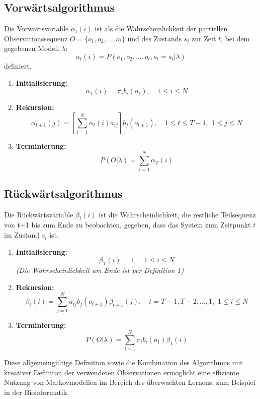\subsection{Vorwärtsalgorithmus}

Die Vorwärtsvariable $\alpha_t(i)$ ist als die Wahrscheinlichkeit der partiellen Observationssequenz $O = \{o_1, o_2, \dots, o_t\}$ und des Zustands $s_i$ zur Zeit $t$, bei dem gegebenen Modell $\lambda$:
$$\alpha_t(i) = P(o_1, o_2, \dots, o_t, s_t = s_i | \lambda)$$ definiert.

\begin{enumerate}
    \item \textbf{Initialisierung:}
    $$\alpha_1(i) = \pi_i b_i(o_1), \quad 1 \leq i \leq N$$

    \item \textbf{Rekursion:}
    $$\alpha_{t+1}(j) = \left[ \sum_{i=1}^{N} \alpha_t(i) a_{ij} \right] b_j(o_{t+1}), \quad 1 \leq t \leq T-1, \,\, 1 \leq j \leq N$$

    \item \textbf{Terminierung:}
    $$P(O|\lambda) = \sum_{i=1}^{N} \alpha_T(i)$$
\end{enumerate}

\subsection{Rückwärtsalgorithmus}
Die Rückwärtsvariable $β_t(i)$ ist die Wahrscheinlichkeit, die restliche Teilsequenz von t+1 bis zum Ende zu beobachten, gegeben, dass das System zum Zeitpunkt $t$ im Zustand $s_i$ ist.
\begin{enumerate}
    \item \textbf{Initialisierung:}
    $$\beta_T(i) = 1, \quad 1 \leq i \leq N$$
    \textit{(Die Wahrscheinlichkeit am Ende ist per Definition 1)}

    \item \textbf{Rekursion:}
    $$\beta_t(i) = \sum_{j=1}^{N} a_{ij} b_j(o_{t+1}) \beta_{t+1}(j), \quad t = T-1, T-2, \dots, 1, \,\, 1 \leq i \leq N$$

    \item \textbf{Terminierung:}
    $$P(O|\lambda) = \sum_{i=1}^{N} \pi_i b_i(o_1) \beta_1(i)$$
\end{enumerate}

Diese allgemeingültige Definition sowie die Kombination des Algorithmus mit kreativer Definiton der verwendeten Observationen ermöglicht eine effiziente Nutzung von Markovmodellen im Bereich des überwachten Lernens, zum Beispiel in der Bioinformatik. \cite{Ma2026HMM}


